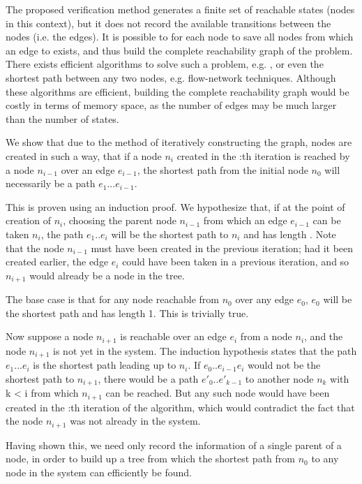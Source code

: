The proposed verification method generates a finite set of reachable states (nodes in this context), but it does not record the available transitions between the nodes (i.e. the edges). It is possible to for each node  to save all nodes  from which an edge to  exists, and thus build the complete reachability graph of the problem. There exists efficient algorithms to solve such a problem, e.g. , or even the shortest path between any two nodes, e.g. flow-network techniques. Although these algorithms are efficient, building the complete reachability graph would be costly in terms of memory space, as the number of edges may be much larger than the number of states.

 
We show that due to the method of iteratively constructing the graph, nodes are created in such a way, that if a node $n_{i}$ created in the :th iteration is reached by a node $n_{i-1}$ over an edge $e_{i-1}$, the shortest path from the initial node $n_0$ will necessarily be a path $e_1...e_{i-1}$.
 
 This is proven using an induction proof. We hypothesize that, if at the point of creation of $n_i$, choosing the parent node $n_{i-1}$ from which an edge $e_{i-1}$ can be taken $n_i$, the path $e_1..e_{i}$ will be the shortest path to $n_i$ and has length . Note that the node $n_{i-1}$ must have been created in the previous iteration; had it been created earlier, the edge $e_i$ could have been taken in a previous iteration, and so $n_{i+1}$ would already be a node in the tree.
 
The base case is that for any node reachable from $n_0$ over any edge $e_0$, $e_0$ will be the shortest path and has length 1. This is trivially true.
 
Now suppose a node $n_{i+1}$ is reachable over an edge $e_i$ from a node $n_i$, and the node $n_{i+1}$ is not yet in the system. The induction hypothesis states that the path $e_1...e_i$ is the shortest path leading up to $n_i$. If $e_0..e_{i-1}e_i$ would not be the shortest path to $n_{i+1}$, there would be a path $e'_0..e'_{k-1}$ to another node $n_k$ with k < i from which $n_{i+1}$ can be reached. But any such node would have been created in the :th iteration of the algorithm, which would contradict the fact that the node $n_{i+1}$ was not already in the system.
 
Having shown this, we need only record the information of a single parent of a node, in order to build up a tree from which the shortest path from $n_0$ to any node in the system can efficiently be found.




